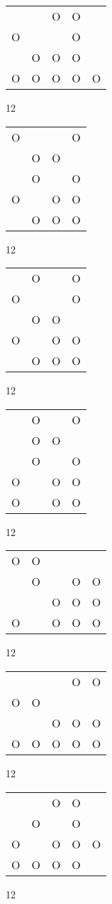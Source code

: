 \begin{tabular}{|m{0.2cm}m{0.2cm}m{0.2cm}m{0.2cm}m{0.2cm}|}\hline
 & &O&O& \\
O& & &O& \\
 &O&O&O& \\
O&O&O&O&O\\
\hline\end{tabular}12
\begin{tabular}{|m{0.2cm}m{0.2cm}m{0.2cm}m{0.2cm}|}\hline
O& & &O\\
 &O&O& \\
 &O& &O\\
O& &O&O\\
 &O&O&O\\
\hline\end{tabular}12
\begin{tabular}{|m{0.2cm}m{0.2cm}m{0.2cm}m{0.2cm}|}\hline
 &O& &O\\
O& & &O\\
 &O&O& \\
O& &O&O\\
 &O&O&O\\
\hline\end{tabular}12
\begin{tabular}{|m{0.2cm}m{0.2cm}m{0.2cm}m{0.2cm}|}\hline
 &O& &O\\
 &O&O& \\
 &O& &O\\
O& &O&O\\
O& &O&O\\
\hline\end{tabular}12
\begin{tabular}{|m{0.2cm}m{0.2cm}m{0.2cm}m{0.2cm}m{0.2cm}|}\hline
O&O& & & \\
 &O& &O&O\\
 & &O&O&O\\
O& &O&O&O\\
\hline\end{tabular}12
\begin{tabular}{|m{0.2cm}m{0.2cm}m{0.2cm}m{0.2cm}m{0.2cm}|}\hline
 & & &O&O\\
O&O& & & \\
 & &O&O&O\\
O&O&O&O&O\\
\hline\end{tabular}12
\begin{tabular}{|m{0.2cm}m{0.2cm}m{0.2cm}m{0.2cm}m{0.2cm}|}\hline
 & &O&O& \\
 &O& &O& \\
O& &O&O&O\\
O&O&O&O& \\
\hline\end{tabular}12
